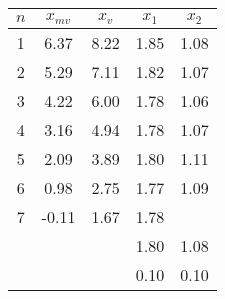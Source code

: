 \begin{tabular}[t]{
  S[table-format = 1.0]
  S[table-format = 2.2]
  S[table-format = 1.2] 
  S[table-format = 1.2] 
  S[table-format = 1.2] 
} \toprule
{$n$}            & {$x_{mv}$} & {$x_v$} & {$x_1$} & {$x_2$} \\                & 6.37     & 8.22    & 1.85    & 1.08    \\
2                & 5.29     & 7.11    & 1.82    & 1.07    \\
3                & 4.22     & 6.00    & 1.78    & 1.06    \\
4                & 3.16     & 4.94    & 1.78    & 1.07    \\
5                & 2.09     & 3.89    & 1.80    & 1.11    \\
6                & 0.98     & 2.75    & 1.77    & 1.09    \\
7                & -0.11    & 1.67    & 1.78    &         \\\midrule
{}  &          &         & 1.80    & 1.08    \\
{}   &          &         & 0.10    & 0.10    \\\bottomrule
\end{tabular}